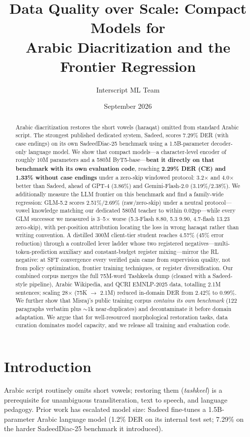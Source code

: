 \documentclass[11pt]{article}
\title{Data Quality over Scale: Compact Models for\\ Arabic Diacritization and the Frontier Regression}
\author{Interscript ML Team}
\date{September 2026}
\begin{document}
\maketitle

\begin{abstract}
Arabic diacritization restores the short vowels (haraqat) omitted from
standard Arabic script. The strongest published dedicated system, Sadeed,
scores 7.29\% DER (with case endings) on its own SadeedDiac-25 benchmark
using a 1.5B-parameter decoder-only language model. We show that compact
models---a character-level encoder of roughly 10M parameters and a 580M
ByT5-base---\textbf{beat it directly on that benchmark with its own
evaluation code}, reaching \textbf{2.29\% DER (CE) and 1.33\% without
case endings} under a zero-skip windowed protocol: 3.2$\times$ and
4.0$\times$ better than Sadeed, ahead of GPT-4 (3.86\%) and
Gemini-Flash-2.0 (3.19\%/2.38\%). We additionally measure the LLM
frontier on this benchmark and find a family-wide regression: GLM-5.2
scores 2.51\%/2.69\% (raw/zero-skip) under a neutral protocol---vowel
knowledge matching our dedicated 580M teacher to within 0.02pp---while
every GLM successor we measured is 3--5$\times$ worse (5.3-Flash 8.80,
5.3 9.90, 4.7-flash 13.23 zero-skip), with per-position attribution
locating the loss in wrong haraqat rather than writing convention.
A distilled 300M client-tier student reaches 4.57\% (45\% error
reduction) through a controlled lever ladder whose two registered
negatives---multi-token-prediction auxiliary and constant-budget
register mixing---mirror the RL negative: at SFT convergence every
verified gain came from supervision quality, not from policy
optimization, frontier training techniques, or register diversification.
Our combined corpus merges the full 75M-word Tashkeela dump (cleaned with a
Sadeed-style pipeline), Arabic Wikipedia, and QCRI EMNLP-2025 data,
totalling 2.1M sentences; scaling 28$\times$ (75K $\rightarrow$ 2.1M)
reduced in-domain DER from 2.42\% to 0.99\%. We further show that
Misraj's public training corpus \emph{contains its own benchmark} (122
paragraphs verbatim plus ${\sim}$1k near-duplicates) and decontaminate
it before domain adaptation. We argue that for well-resourced
morphological restoration tasks, data curation dominates model
capacity, and we release all training and evaluation code.
\end{abstract}

\section{Introduction}
Arabic script routinely omits short vowels; restoring them
(\emph{tashkeel}) is a prerequisite for unambiguous transliteration, text
to speech, and language pedagogy. Prior work has escalated model size:
Sadeed \cite{sadeed} fine-tunes a 1.5B-parameter Arabic language model
(1.2\% DER on its internal test set; 7.29\% on the harder SadeedDiac-25
benchmark it introduced).
\end{document}
